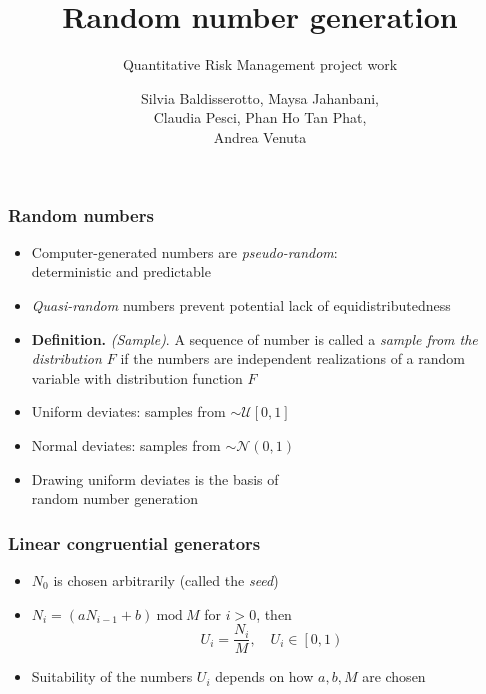 \documentclass[10pt, serif, mathserif]{beamer}
\title{Random number generation}
\subtitle{Quantitative Risk Management project work}
\date{}
\author{Silvia Baldisserotto, Maysa Jahanbani, \\ Claudia Pesci, Phan Ho Tan Phat, \\ Andrea Venuta}
\institute{Università degli Studi di Firenze - Finance and Risk Management}
\begin{document}
\maketitle

\begin{frame}
  \frametitle{Random numbers}
  \begin{itemize}
  	\item Computer-generated numbers are \emph{pseudo-random}: \\ deterministic and predictable
  	\item \emph{Quasi-random} numbers prevent potential lack of equidistributedness
  	\item \textbf{Definition.} \emph{(Sample)}. A sequence of number is called a \emph{sample from the distribution $F$}
  	  if the numbers are independent realizations of a random variable with distribution function $F$
	\item Uniform deviates: samples from $\sim \mathcal{U}  \left[ 0, 1 \right] $
	\item Normal deviates: samples from $\sim \mathcal{N}  \left( 0, 1 \right) $
	\item Drawing uniform deviates is the basis of \\ random number generation
  \end{itemize}
\end{frame}

\begin{frame}
  \frametitle{Linear congruential generators}
  	\begin{itemize}
  	  \item $N_0$ is chosen arbitrarily (called the \emph{seed})
  	  \item $N_i = (aN_{i-1} + b)\ \text{mod}\ M$ for $i > 0$, then
  	    \\ \[U_i = \frac{N_i}{M},\quad U_i \in \left[0,1\right)\] 
        \medskip
  	  \item Suitability of the numbers $U_i$ depends on how $a, b, M$ are chosen
  	\end{itemize}
\end{frame}
\end{document}
